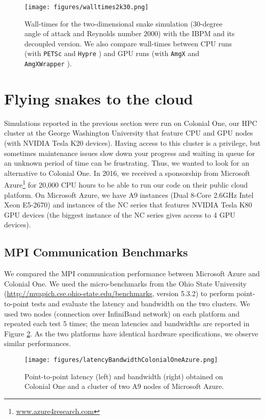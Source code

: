\documentclass[10pt]{article}
\newcommand{\petsc}{\texttt{PETSc} }
\newcommand{\amgx}{\texttt{AmgX} }
\newcommand{\amgxwrapper}{\texttt{AmgXWrapper} }
\newcommand{\hypre}{\texttt{Hypre} }
\begin{document}
\begin{figure}[h!]
\centering
\texttt{[image: figures/walltimes2k30.png]}
\caption{Wall-times for the two-dimensional snake simulation (30-degree angle of attack and Reynolds number $2000$) with the IBPM and its decoupled version. We also compare wall-times between CPU runs (with \petsc and \hypre) and GPU runs (with \amgx and \amgxwrapper).}
\label{walltime_snake_2k30}
\end{figure}


\section{Flying snakes to the cloud}

Simulations reported in the previous section were run on Colonial One, our HPC cluster at the George Washington University that feature CPU and GPU nodes (with NVIDIA Tesla K20 devices).
Having access to this cluster is a privilege, but sometimes maintenance issues slow down your progress and waiting in queue for an unknown period of time can be frustrating.
Thus, we wanted to look for an alternative to Colonial One.
In 2016, we received a sponsorship from Microsoft Azure\footnote{\url{www.azure4research.com}} for 20,000 CPU hours to be able to run our code on their public cloud platform.
On Microsoft Azure, we have A9 instances (Dual 8-Core 2.6GHz Intel Xeon E5-2670) and instances of the NC series that features NVIDIA Tesla K80 GPU devices (the biggest instance of the NC series gives access to 4 GPU devices).

\subsection{MPI Communication Benchmarks}

We compared the MPI communication performance between Microsoft Azure and Colonial One.
We used the micro-benchmarks from the Ohio State University (\url{http://mvapich.cse.ohio-state.edu/benchmarks}, version 5.3.2) to perform point-to-point tests and evaluate the latency and bandwidth on the two clusters. We used two nodes (connection over InfiniBand network) on each platform and repeated each test 5 times; the mean latencies and bandwidths are reported in Figure \ref{latency_bandwidth_colonialone_azure}. As the two platforms have identical hardware specifications, we observe similar performances.

\begin{figure}[h!]
\centering
\texttt{[image: figures/latencyBandwidthColonialOneAzure.png]}
\caption{Point-to-point latency (left) and bandwidth (right) obtained on Colonial One and a cluster of two A9 nodes of Microsoft Azure.}
\label{latency_bandwidth_colonialone_azure}
\end{figure}
\end{document}
